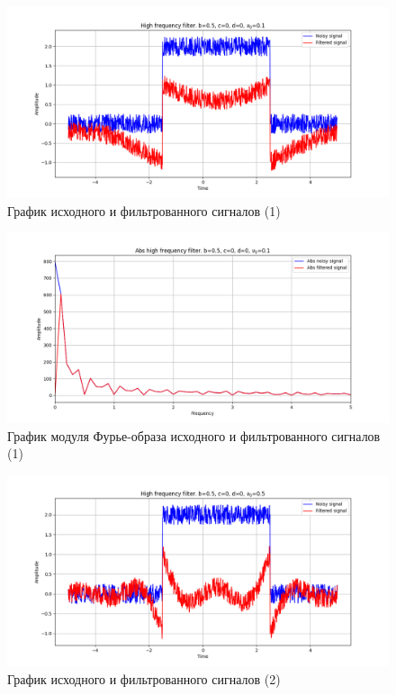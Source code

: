 \documentclass[a4paper, 12pt]{article}
\begin{document}
    \begin{figure}[H]
        \centering
        \includegraphics[scale=0.48]{1_nolow.png}
        \captionsetup{skip=0pt}
        \caption{График исходного и фильтрованного сигналов (1)}
        \label{fig:fig27}
    \end{figure}
    \begin{figure}[H]
        \centering
        \includegraphics[scale=0.48]{1_abs_nolow.png}
        \captionsetup{skip=0pt}
        \caption{График модуля Фурье-образа исходного и фильтрованного сигналов (1)}
        \label{fig:fig28}
    \end{figure}
    \begin{figure}[H]
        \centering
        \includegraphics[scale=0.48]{2_nolow.png}
        \captionsetup{skip=0pt}
        \caption{График исходного и фильтрованного сигналов (2)}
        \label{fig:fig29}
    \end{figure}
\end{document}

